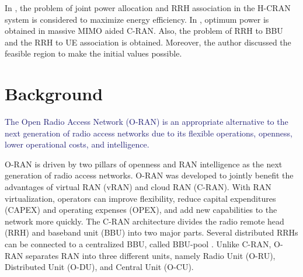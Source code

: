 \documentclass[lettersize,journal]{IEEEtran}
\begin{document}
In \cite{ali2019energy,ali2019energy1,ali2018joint}, the problem of joint power allocation and RRH association in the H-CRAN system is considered to maximize energy efficiency.
In \cite{amani2019power}, optimum power is obtained in massive MIMO aided C-RAN. Also, the problem of RRH to BBU and the RRH to UE association is obtained. Moreover, the author discussed the feasible region to make the initial values possible.
\section{Background}\label{BG}
\textcolor{MidnightBlue}{The Open Radio Access Network (O-RAN) is an appropriate alternative to the next generation of radio access networks due to its flexible operations, openness, lower operational costs, and intelligence.}

O-RAN is driven by two pillars of openness and RAN intelligence as the next generation of radio access networks. O-RAN was developed to jointly benefit the advantages of virtual RAN (vRAN) and cloud RAN (C-RAN). With RAN virtualization, operators can improve flexibility, reduce capital expenditures (CAPEX) and operating expenses (OPEX), and add new capabilities to the network more quickly. The C-RAN architecture divides the radio remote head (RRH) and baseband unit (BBU) into two major parts. Several distributed RRHs can be connected to a centralized BBU, called BBU-pool \cite{han2019research}. Unlike C-RAN, O-RAN separates RAN into three different units, namely Radio Unit (O-RU), Distributed Unit (O-DU), and Central Unit (O-CU).
\end{document}
